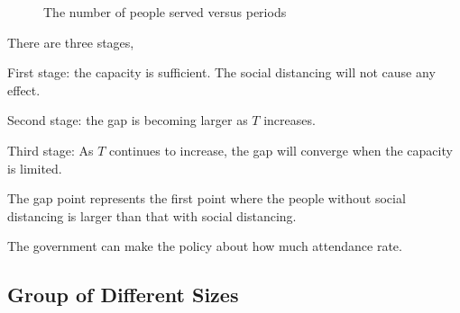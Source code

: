 \begin{figure}[h]
  \centering
  \caption{The number of people served versus periods}
  \label{Fig.lable}
\end{figure}

There are three stages, 

First stage: the capacity is sufficient. The social distancing will not cause any effect.

Second stage: the gap is becoming larger as $T$ increases. 

Third stage: As $T$ continues to increase, the gap will converge when the capacity is limited.

The gap point represents the first point where the people without social distancing is larger than that with social distancing. 

The government can make the policy about how much attendance rate.

\subsection{Group of Different Sizes}


